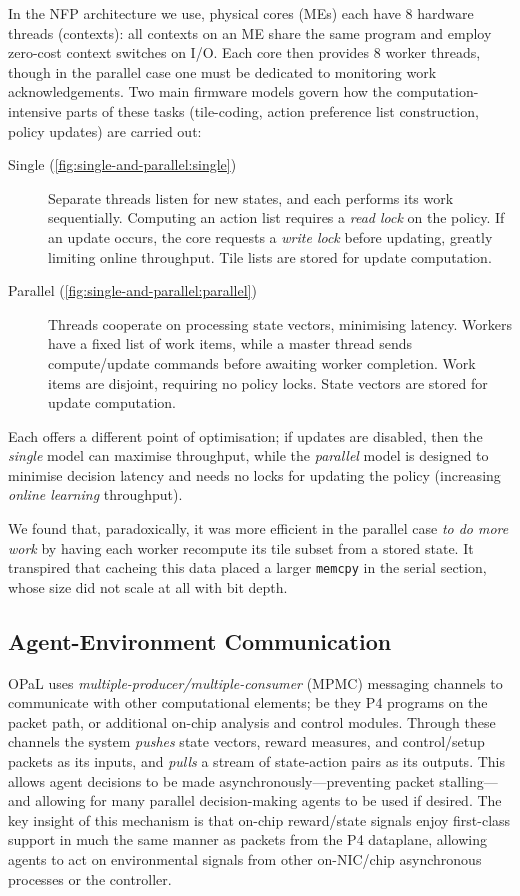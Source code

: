 \documentclass[sigconf,natbib=false]{acmart}
\newcommand{\approachshort}{OPaL}
\begin{document}
In the NFP architecture we use, physical cores (MEs) each have 8 hardware threads (contexts): all contexts on an ME share the same program and employ zero-cost context switches on I/O.
Each core then provides 8 worker threads, though in the parallel case one must be dedicated to monitoring work acknowledgements.
Two main firmware models govern how the computation-intensive parts of these tasks (tile-coding, action preference list construction, policy updates) are carried out:
\begin{description}
	\item[Single (\cref{fig:single-and-parallel:single})] Separate threads listen for new states, and each performs its work sequentially. Computing an action list requires a \emph{read lock} on the policy. If an update occurs, the core requests a \emph{write lock} before updating, greatly limiting online throughput. Tile lists are stored for update computation.
	\item[Parallel (\cref{fig:single-and-parallel:parallel})] Threads cooperate on processing state vectors, minimising latency. Workers have a fixed list of work items, while a master thread sends compute/update commands before awaiting worker completion. Work items are disjoint, requiring no policy locks. State vectors are stored for update computation.
\end{description}
Each offers a different point of optimisation; if updates are disabled, then the \emph{single} model can maximise throughput, while the \emph{parallel} model is designed to minimise decision latency and needs no locks for updating the policy (increasing \emph{online learning} throughput).

We found that, paradoxically, it was more efficient in the parallel case \emph{to do more work} by having each worker recompute its tile subset from a stored state.
It transpired that cacheing this data placed a larger \texttt{memcpy} in the serial section, whose size did not scale at all with bit depth.

\subsection{Agent-Environment Communication}\label{sec:agent-environment-communication}
\approachshort{} uses \emph{multiple-producer/multiple-consumer} (MPMC) messaging channels to communicate with other computational elements; be they P4 programs on the packet path, or additional on-chip analysis and control modules.
Through these channels the system \emph{pushes} state vectors, reward measures, and control/setup packets as its inputs, and \emph{pulls} a stream of state-action pairs as its outputs.
This allows agent decisions to be made asynchronously---preventing packet stalling---and allowing for many parallel decision-making agents to be used if desired.
The key insight of this mechanism is that on-chip reward/state signals enjoy first-class support in much the same manner as packets from the P4 dataplane, allowing agents to act on environmental signals from other on-NIC/chip asynchronous processes or the controller.
\end{document}
